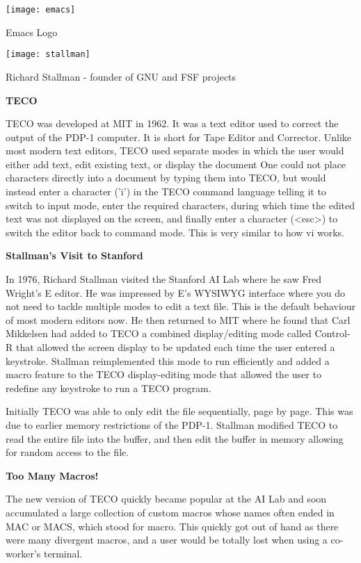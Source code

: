 \begin{marginfigure}[-8cm]
  \texttt{[image: emacs]}
  \caption{Emacs Logo}
\end{marginfigure}


\begin{marginfigure}
  \texttt{[image: stallman]}
  \caption{Richard Stallman - founder of GNU and FSF projects}
\end{marginfigure}

\textbf{TECO}

TECO was developed at MIT in 1962. It was a text editor
used to correct the output of the PDP-1 computer.
It is short for Tape Editor and Corrector.
Unlike most modern text editors,
TECO used separate modes in which the user would either
add text, edit existing text, or display the document
One could not place characters directly into a document
by typing them into TECO, but would instead enter a
character ('i') in the TECO command language telling
it to switch to input mode, enter the required characters,
during which time the edited text was not displayed on
the screen, and finally enter a character (<esc>) to
switch the editor back to command mode. This is very
similar to how vi works.

\textbf{Stallman's Visit to Stanford}

In 1976, Richard Stallman visited the Stanford AI Lab
where he saw Fred Wright's E editor. He was impressed
by E's WYSIWYG
interface where you do not need to tackle multiple
modes to edit a text file. This is the default behaviour
of most modern editors now.
He then returned to MIT where he found that
Carl Mikkelsen had added to TECO a combined
display/editing mode called Control-R that allowed
the screen display to be updated each time the user
entered a keystroke. Stallman reimplemented this mode
to run efficiently and added a macro feature to the TECO
display-editing mode that allowed the user to redefine
any keystroke to run a TECO program.

Initially TECO was able to only edit the file
sequentially, page by page. This was due to earlier
memory restrictions of the PDP-1.
Stallman modified TECO to read the entire file into
the buffer, and then edit the buffer in memory
allowing for random access to the file.

\textbf{Too Many Macros!}

The new version of TECO quickly became popular at
the AI Lab and soon accumulated a large collection
of custom macros whose names often ended in MAC or
MACS, which stood for macro.
This quickly got out of hand as there were many
divergent macros, and a user would be totally
lost when using a co-worker's terminal.

